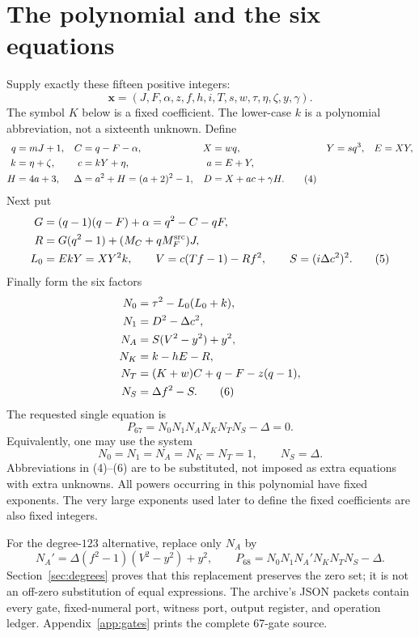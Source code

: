 \documentclass[11pt,a4paper]{article}
\theoremstyle{definition}
\theoremstyle{remark}
\newcommand{\Pbase}{P_{67}}
\newcommand{\Plow}{P_{68}}
\begin{document}
\section{The polynomial and the six equations}\label{sec:polynomial}
Supply exactly these fifteen positive integers:
\[
 \mathbf x=(J,F,\alpha,z,f,h,i,T,s,w,\tau,\eta,\zeta,y,\gamma).
 \tag{3}
\]
The symbol \(K\) below is a fixed coefficient. The lower-case \(k\) is
a polynomial abbreviation, not a sixteenth unknown. Define
\begin{align}
 q&=mJ+1,& C&=q-F-\alpha,& X&=wq,&Y&=sq^3,& E&=XY,\notag\\
 k&=\eta+\zeta,& c&=kY+\eta,& a&=E+Y,\notag\\
 H&=4a+3,&\Delta&=a^2+H=(a+2)^2-1,&
 D&=X+ac+\gamma H. \tag{4}\label{eq:abbrev}
\end{align}
Next put
\begin{align}
 G&=(q-1)(q-F)+\alpha=q^2-C-qF,\notag\\
 R&=G(q^2-1)+(M_C+qM_F^{\rm src})J,\notag\\
 L_0&=EkY=XY^2k,\qquad
 V=c(Tf-1)-Rf^2,\qquad S=(i\Delta c^2)^2. \tag{5}\label{eq:pack}
\end{align}
Finally form the six factors
\begin{align}
 N_0&=\tau^2-L_0(L_0+k),\notag\\
 N_1&=D^2-\Delta c^2,\notag\\
 N_A&=S(V^2-y^2)+y^2,\notag\\
 N_K&=k-hE-R,\notag\\
 N_T&=(K+w)C+q-F-z(q-1),\notag\\
 N_S&=\Delta f^2-S. \tag{6}\label{eq:factors}
\end{align}
The requested single equation is
\[
 \boxed{\quad \Pbase=N_0N_1N_AN_KN_TN_S-\Delta=0.\quad}
 \tag{7}\label{eq:poly}
\]
Equivalently, one may use the system
\[
 \boxed{\quad N_0=N_1=N_A=N_K=N_T=1,\qquad N_S=\Delta.\quad}
 \tag{8}\label{eq:system}
\]
Abbreviations in (4)--(6) are to be substituted, not imposed as extra
equations with extra unknowns. All powers occurring in this polynomial
have fixed exponents. The very large exponents used later to define
the fixed coefficients are also fixed integers.

For the degree-\(123\) alternative, replace only \(N_A\) by
\[
 N_A'=\Delta(f^2-1)(V^2-y^2)+y^2,\qquad
 \Plow=N_0N_1N_A'N_KN_TN_S-\Delta.
 \tag{9}\label{eq:lowpoly}
\]
Section~\ref{sec:degrees} proves that this replacement preserves the
zero set; it is not an off-zero substitution of equal expressions.
The archive's JSON packets contain every gate, fixed-numeral port,
witness port, output register, and operation ledger.
Appendix~\ref{app:gates} prints the complete 67-gate source.
\end{document}
